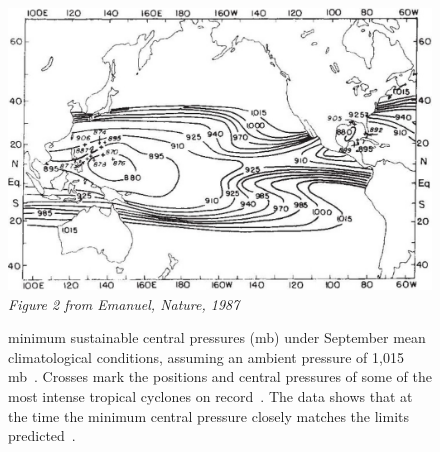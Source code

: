 \begin{figure}[htb!]
\centering
\includegraphics[width=1\linewidth]{images/e87-slimmed-verif.png}\\
\textit{Figure 2 from Emanuel, Nature, 1987~\cite{emanuel1987dependence}}
\caption{minimum sustainable central pressures (mb) under September mean
climatological conditions, assuming an ambient pressure of 1,015 mb~\cite{emanuel1986air}.
Crosses mark the positions and central pressures of some of the most intense
tropical cyclones on record~\cite{anthes2016tropical}.
The data shows that at the time the minimum central pressure
closely matches the limits predicted~\cite{emanuel1986air}. }
\label{fig:emanuel87}
\end{figure}
